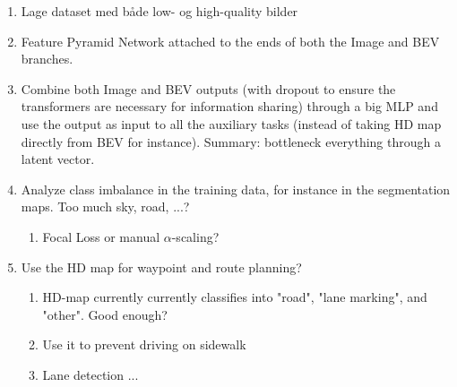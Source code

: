 \begin{enumerate}
    \item Lage dataset med både low- og high-quality bilder
    
    \item Feature Pyramid Network attached to the ends of both the Image and BEV branches.
    
    \item Combine both Image and BEV outputs (with dropout to ensure the transformers are necessary for information sharing) through a big MLP and use the output as input to all the auxiliary tasks (instead of taking HD map directly from BEV for instance). Summary: bottleneck everything through a latent vector.
    
    \item Analyze class imbalance in the training data, for instance in the segmentation maps. Too much sky, road, ...?
    \begin{enumerate}
        \item Focal Loss or manual $\alpha$-scaling?
    \end{enumerate}
    
    \item Use the HD map for waypoint and route planning?
    \begin{enumerate}
        \item HD-map currently currently classifies into "road", "lane marking", and "other". Good enough?
        \item Use it to prevent driving on sidewalk
        \item Lane detection ...
    \end{enumerate}
\end{enumerate}
